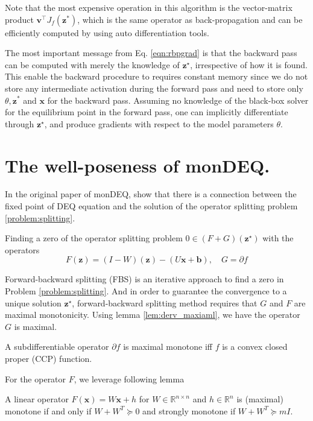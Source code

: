 \documentclass[twoside]{article}
\begin{document}
Note that the most expensive operation in this algorithm is the vector-matrix product $\mathbf{v}^\top J_{f}( \mathbf{z}^{*})$, which is the same operator as back-propagation and can be efficiently computed by using auto differentiation tools.

The most important message from Eq. \ref{eqn:rbpgrad} is that the backward pass can be computed with merely the knowledge of $\mathbf{z}^\star$, irrespective of how it is found.
This enable the backward procedure to requires constant memory since we do not store any intermediate activation during the forward pass and need to store only $\theta, \mathbf{z}^*$ and $\mathbf{x}$ for the backward pass. Assuming no knowledge of the black-box solver for the equilibrium point in the forward pass, one can implicitly differentiate through $\mathbf{z}^\star$, and produce gradients with respect to the model parameters $\theta$.

\section{The well-poseness of monDEQ.}
\label{sec:well_poseness_of_monDEQ}

In the original paper of monDEQ, \citet{monotonedeq} show that there is a connection between the fixed point of DEQ equation and the solution of the operator splitting problem \ref{problem:splitting}. 
\begin{problem}
\label{problem:splitting}
Finding a zero of the operator splitting problem $0 \in(F+G)\left(\mathbf{z}^{\star}\right)$ with the operators
$$
F(\mathbf{z})=(I-W)(\mathbf{z})-(U \mathbf{x}+ \mathbf{b}), \quad G=\partial f
$$
\end{problem}

Forward-backward splitting (FBS) is an iterative approach to find a zero in Problem \ref{problem:splitting}. And in order to guarantee the convergence to a unique solution $\mathbf{z}^\star$, forward-backward splitting method requires that $G$ and $F$ are maximal monotonicity. Using lemma \ref{lem:derv_maxiaml}, we have the operator $G$ is maximal.
\begin{lemma}
\label{lem:derv_maxiaml}
A subdifferentiable operator $\partial f$ is maximal monotone iff $f$ is a convex closed proper (CCP) function.
\end{lemma}
 For the operator $F$, we leverage following lemma 
\begin{lemma}
\label{lem:linear_maxiaml}
A linear operator $F(\mathbf{x}) = W\mathbf{x} + h$ for $W \in \mathbb{R}^{n \times n}$ and $h \in \mathbb{R}^n$ is (maximal) monotone if and only if $W + W^T \succeq 0$ and strongly monotone if $W + W^T \succeq mI$. 
\end{lemma}
\end{document}
